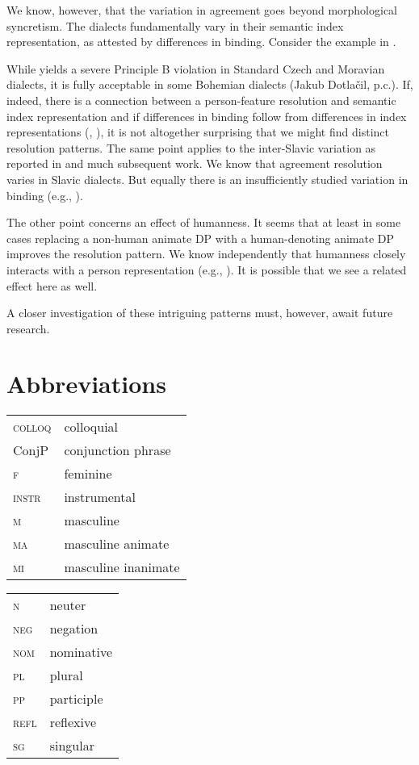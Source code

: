 \documentclass[output=paper,
modfonts
newtxmath,
hidelinks
]{langscibook}
\begin{document}
We know, however, that the variation in agreement goes beyond morphological syncretism. The dialects fundamentally vary in their semantic index representation, as attested by differences in binding. Consider the example in .

\z

\noindent While  yields a severe Principle B violation in Standard Czech and Moravian dialects, it is fully acceptable in some Bohemian dialects (Jakub Dotlačil, p.c.). If, indeed, there is a connection between a person-feature resolution and semantic index representation and if differences in binding follow from differences in index representations (\citealt{Heim1998}, \citealt{Roelofsen2008}), it is not altogether surprising that we might find distinct resolution patterns. The same point applies to the inter-Slavic variation as reported in \citet{corbett83} and much subsequent work. We know that agreement resolution varies in Slavic dialects. But equally there is an insufficiently studied variation in binding (e.g., \citealt{Nikolaeva2014}). 

The other point concerns an effect of humanness. It seems that at least in some cases replacing  a non-human animate DP with a human-denoting animate DP improves the resolution pattern. We know independently that humanness closely interacts with a person representation (e.g., \citealt{Ritter2014, Wiltschko2015}). It is possible that we see a related effect here as well.

A closer investigation of these intriguing patterns must, however, await future research.


\section*{Abbreviations}

\begin{tabularx}{.5\textwidth}{@{}lQ@{}}
\textsc{colloq}&colloquial\\
ConjP&conjunction phrase\\
\textsc{f}&feminine\\
\textsc{instr}&instrumental\\
\textsc{m}&masculine\\
\textsc{ma}&masculine animate\\
\textsc{mi}&masculine inanimate\\
\end{tabularx}%
\begin{tabularx}{.5\textwidth}{@{}lQ@{}}
\textsc{n}&neuter\\
\textsc{neg}&negation\\
\textsc{nom}&nominative\\
\textsc{pl}&plural\\
\textsc{pp}&participle\\
\textsc{refl}&reflexive\\
\textsc{sg}&singular\\
\end{tabularx}
\end{document}
